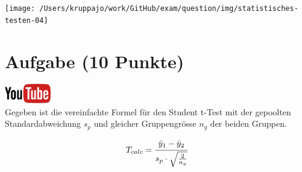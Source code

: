 \documentclass[a4paper, 10pt]{scrartcl}\usepackage[]{graphicx}\usepackage[]{xcolor}
\begin{document}
\begin{center}
  \texttt{[image: /Users/kruppajo/work/GitHub/exam/question/img/statistisches-testen-04]}
\end{center}


 
\clearpage

\section{Aufgabe \hfill (10 Punkte)}

\hfill\href{https://youtu.be/bc1m7rkXld4}{\includegraphics[width =
  2cm]{img/youtube}}\\[1Ex]



Gegeben ist die vereinfachte Formel f{\"u}r den Student t-Test mit der
gepoolten Standardabweichung $s_p$ und gleicher Gruppengr{\"o}sse $n_g$ der
beiden Gruppen.

\begin{equation*}
  \label{eq:1}
  T_{calc} = \cfrac{\bar{y}_1 - \bar{y}_2}{s_p \cdot \sqrt{\tfrac{2}{n_g}}}
\end{equation*}
\end{document}
